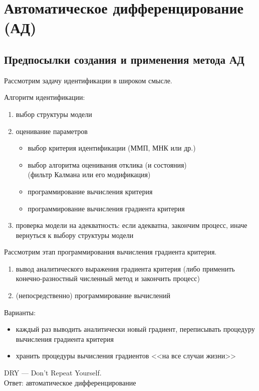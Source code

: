 \documentclass{beamer}
\begin{document}
\section{Автоматическое дифференцирование (АД)}

\subsection{Предпосылки создания и применения метода АД}

\begin{frame}{\secname}{\subsecname}
  Рассмотрим задачу идентификации в широком смысле. \\ \pause

  Алгоритм идентификации: \pause
  \begin{enumerate}
	\item выбор структуры модели \pause
	\item оценивание параметров \pause
	\begin{itemize}
	  \item выбор критерия идентификации (ММП, МНК или др.) \pause
	  \item выбор алгоритма оценивания отклика (и состояния) \pause\\(фильтр Калмана
		или его модификация) \pause
	  \item программирование вычисления критерия \pause
	  \item программирование вычисления градиента критерия \pause
	\end{itemize}
	\item проверка модели на адекватность: если адекватна, закончим процесс,
	  иначе вернуться к выбору структуры модели
  \end{enumerate}
  
\end{frame}

\begin{frame}{\secname}{\subsecname}
  Рассмотрим этап программирования вычисления градиента критерия. \pause
  \begin{enumerate}
	\item вывод аналитического выражения градиента критерия \pause (либо применить
	  конечно-разностный численный метод и закончить процесс) \pause
	\item (непосредственно) программирование вычислений
  \end{enumerate}
\end{frame}

\begin{frame}{\secname}{\subsecname}
  Варианты: \pause
  \begin{itemize}
	\item каждый раз выводить аналитически новый градиент, \pause переписывать
	процедуру вычисления градиента критерия \pause
  \item хранить процедуры вычисления градиентов <<на все случаи жизни>> \pause
  \end{itemize}
  DRY --- Don't Repeat Yourself. \\ \pause
  Ответ: автоматическое дифференцирование
\end{frame}
\end{document}
